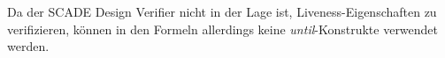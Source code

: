 Da der SCADE Design Verifier nicht in der Lage ist, Liveness-Eigenschaften zu verifizieren, können in den Formeln allerdings keine \emph{until}-Konstrukte verwendet werden.





